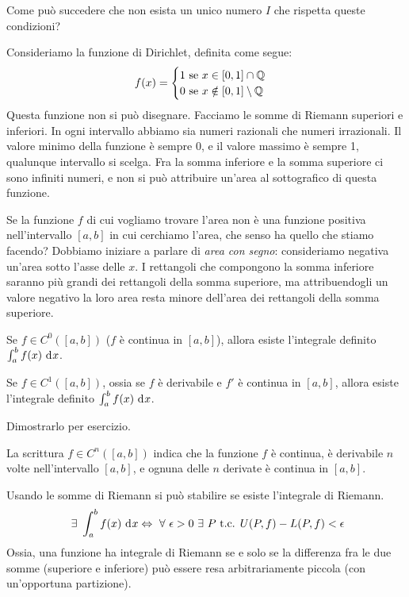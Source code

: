 Come pu\`o succedere che non esista un unico numero $I$ che rispetta queste condizioni?

Consideriamo la funzione di Dirichlet, definita come segue:
\[
f(x) = 
\begin{cases}
1 \text{ se } x \in [0,1] \cap \mathbb{Q} \\
0 \text{ se } x \notin [0,1] \setminus \mathbb{Q}
\end{cases}
\]
Questa funzione non si pu\`o disegnare. Facciamo le somme di Riemann superiori e inferiori. In ogni intervallo abbiamo sia numeri razionali che numeri irrazionali. Il valore minimo della funzione \`e sempre 0, e il valore massimo \`e sempre 1, qualunque intervallo si scelga. Fra la somma inferiore e la somma superiore ci sono infiniti numeri, e non si pu\`o attribuire un'area al sottografico di questa funzione.

Se la funzione $f$ di cui vogliamo trovare l'area non \`e una funzione positiva nell'intervallo $[a,b]$ in cui cerchiamo l'area, che senso ha quello che stiamo facendo? Dobbiamo iniziare a parlare di \emph{area con segno}: consideriamo negativa un'area sotto l'asse delle $x$. I rettangoli che compongono la somma inferiore saranno pi\`u grandi dei rettangoli della somma superiore, ma attribuendogli un valore negativo la loro area resta minore dell'area dei rettangoli della somma superiore.

\begin{theorem}
\label{integrale_funzione_continua}
Se $f \in C^{0}([a,b])$ ($f$ \`e continua in $[a,b]$), allora esiste l'integrale definito $\int_{a}^{b} f(x) \dx$.
\end{theorem}

\begin{theorem}
Se $f \in C^{1}([a,b])$, ossia se $f$ \`e derivabile e $f'$ \`e continua in $[a,b]$, allora esiste l'integrale definito $\int_{a}^{b} f(x) \dx$.
\end{theorem}
Dimostrarlo per esercizio.

La scrittura $f \in C^{n} ([a,b])$ indica che la funzione $f$ \`e continua, \`e derivabile $n$ volte nell'intervallo $[a,b]$, e ognuna delle $n$ derivate \`e continua in $[a,b]$.

\begin{theorem} \label{integrabilita_riemann}
Usando le somme di Riemann si pu\`o stabilire se esiste l'integrale di Riemann.
\[
\exists \int_{a}^{b} f(x) \dx \iff \forall \epsilon > 0 \exists P \text{ t.c. } U(P,f) - L(P,f) < \epsilon
\]
Ossia, una funzione ha integrale di Riemann se e solo se la differenza fra le due somme (superiore e inferiore) pu\`o essere resa arbitrariamente piccola (con un'opportuna partizione).
\end{theorem}

